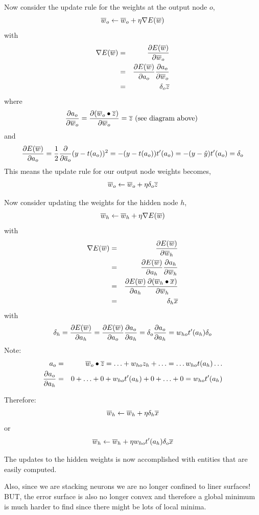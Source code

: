 \documentclass[a4paper,blends,pdf,colorBG,slideColor]{prosper}
\begin{document}
\small
Now consider the update rule for the weights at the output node $o$,
\[
\overline{w}_o \leftarrow \overline{w}_o + \eta \nabla E(\overline{w})
\]
with
\begin{eqnarray*}
\nabla E(\overline{w}) &=& \frac{\partial E(\overline{w})}{\partial \overline{w}_o}\\
	&=& \frac{\partial E(\overline{w})}{\partial a_o} \frac{\partial a_o}{\partial \overline{w}_o}\\
	&=& \delta_o \overline{z}
\end{eqnarray*}
where
\[
\frac{\partial a_o}{\partial \overline{w}_o} = \frac{\partial (\overline{w}_o \bullet \overline{z})}{\partial \overline{w}_o} = \overline{z} \mbox{ (see diagram above)
}
\]
and
\[
 \frac{\partial E(\overline{w})}{\partial a_o} = \frac{1}{2} \frac{\partial}{\partial \overline{a}_o} (y - t(a_o))^2 = - (y - t(a_o))t'(a_o) 
= - (y - \hat{y})t'(a_o) = \delta_o
\]
This means the update rule for our output node weights becomes,
\[
\overline{w}_o \leftarrow \overline{w}_o + \eta\delta_o \overline{z}
\]

\es

\small
Now consider updating the weights for the hidden node $h$,
\[
\overline{w}_h \leftarrow \overline{w}_h + \eta \nabla E(\overline{w})
\]
with
\begin{eqnarray*}
\nabla E(\overline{w}) &=& \frac{\partial E(\overline{w})}{\partial \overline{w}_h}\\
	&=& \frac{\partial E(\overline{w})}{\partial a_h} \frac{\partial a_h}{\partial \overline{w}_h}\\
	&=& \frac{\partial E(\overline{w})}{\partial a_h} \frac{\partial (\overline{w}_h\bullet\overline{x})}{\partial \overline{w}_h}\\
	&=& \delta_h \overline{x}
\end{eqnarray*}
with
\[
\delta_h = \frac{\partial E(\overline{w})}{\partial a_h} = \frac{\partial E(\overline{w})}{\partial a_o}\frac{\partial a_o}{\partial a_h} = \delta_o \frac{\partial a_o}{\partial a_h} = w_{ho} t'(a_h)\delta_o
\]
Note:
\begin{eqnarray*}
a_o &=& \overline{w}_o \bullet \overline{z} = \ldots + w_{ho} z_h + \ldots = \ldots w_{ho} t(a_h)\dots\\ 
\frac{\partial a_o}{\partial a_h} &=& 0 + \ldots + 0 +w_{ho}t'(a_h)+0+\ldots+0 =w_{ho}t'(a_h)
\end{eqnarray*}

\es

Therefore:
\[
\overline{w}_h \leftarrow \overline{w}_h + \eta \delta_h \overline{x} 
\]
or
\[
\overline{w}_h \leftarrow \overline{w}_h +\eta w_{ho} t'(a_h)\delta_o \overline{x}
\]

The updates to the hidden weights is now accomplished with entities that are easily computed.

\vspace{.2in}

Also, since we are stacking neurons we are no longer confined to liner surfaces!  BUT, the error surface is also no longer convex and therefore
a global minimum is much harder to find since there might be lots of local minima.
\es
\end{document}
